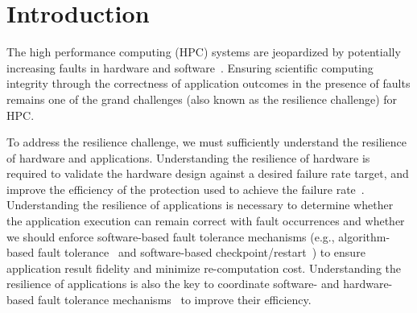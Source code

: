 \section{Introduction}
\label{sec:intro}
\begin{comment}
The continued growth of large-scale high performance computing (HPC) systems is
fueled by the two trends: continued integration of additional
functionality onto system nodes, and the increased number of
nodes (and components) in the systems.
As a result, these large-scale systems are jeopardized by
potentially increasing faults
in hardware and software~\cite{fengshui_sc13, sigmetrics09:schroeder, asplos15:vilas, dramerrors_asplos12, sc12:vilas}. %
Ensuring scientific computing integrity through the correctness of application
outcomes in the presence of faults %
remains one of the grand challenges (also known as the resilience challenge) for large-scale HPC systems~\cite{9-cappello2009toward, 9-cappello2014toward}. 
\end{comment}

The high performance computing (HPC) systems are jeopardized by potentially increasing faults
in hardware and software~\cite{asplos15:vilas, fengshui_sc13}. %
Ensuring scientific computing integrity through the correctness of application outcomes in the presence of faults 
remains one of the grand challenges (also known as the resilience challenge) for HPC. 

To address the resilience challenge, we must sufficiently understand the resilience of hardware and applications.
Understanding the resilience of hardware is required to validate the hardware design against a desired failure rate target, 
and improve the efficiency of the protection used to achieve the failure rate~\cite{micro15:steven, micro14:wilkening}.
Understanding the resilience of applications is necessary to determine whether the application execution can
remain correct with fault occurrences and whether we should enforce software-based fault tolerance mechanisms 
(e.g., algorithm-based fault tolerance~\cite{ftcg_ppopp13, tc84_abft} and 
software-based checkpoint/restart~\cite{4-kharbascombining})
to ensure application result fidelity and minimize re-computation cost.
Understanding the resilience of applications is also the key to coordinate software- and hardware-based fault tolerance mechanisms~\cite{CrossLayer_icpp12, abft_ecc:SC13} to improve their efficiency. 


